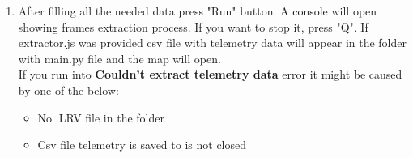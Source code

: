 \documentclass[a4paper,12pt]{book}
\begin{document}
\begin{enumerate}
\begin{itemize}
	\end{itemize}
	\item \begin{minipage}[t]{\linewidth}
		\raggedright
		\medskip	
	\end{minipage}
	After filling all the needed data press "Run" button. A console will open showing frames extraction process. If you want to stop it, press "Q". If extractor.js was provided csv file with telemetry data will appear in the folder with main.py file and the map will open.\\
	If you run into \textbf{Couldn't extract telemetry data} error it might be caused by one of the below:
	\begin{itemize}
		\item No .LRV file in the folder
		\item Csv file telemetry is saved to is not closed
	\end{itemize}
\end{enumerate}
\end{document}
